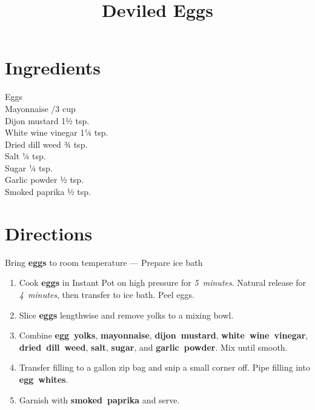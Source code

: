 \documentclass[11pt,letterpaper]{article}
\title{Deviled Eggs}
\author{}
\date{}
\begin{document}
\maketitle
\thispagestyle{empty}

\section*{Ingredients}
\setlength{\columnsep}{20pt}
\begin{multicols}{2}
\noindent
    Eggs  \\
    Mayonnaise /3 cup \\
    Dijon mustard \dotfill 1½ tsp. \\
    White wine vinegar \dotfill 1¼ tsp. \\
    \columnbreak
    Dried dill weed \dotfill ¾ tsp. \\
    Salt \dotfill ¼ tsp. \\
    Sugar \dotfill ¼ tsp. \\
    Garlic powder \dotfill ½ tsp. \\
    Smoked paprika \dotfill ½ tsp. \\
\end{multicols}

\section*{Directions}

\noindent
Bring \textbf{eggs} to room temperature ---
Prepare ice bath

\begin{enumerate}
    \item Cook \textbf{eggs} in Instant Pot on high pressure for \textit{5~minutes}. Natural release for \textit{4~minutes}, then transfer to ice bath. Peel eggs.
    
    \item Slice \textbf{eggs} lengthwise and remove yolks to a mixing bowl.
    
    \item Combine \textbf{egg~yolks}, \textbf{mayonnaise}, \textbf{dijon~mustard}, \textbf{white~wine~vinegar}, \textbf{dried~dill~weed}, \textbf{salt}, \textbf{sugar}, and \textbf{garlic~powder}. Mix until smooth.
    
    \item Transfer filling to a gallon zip bag and snip a small corner off. Pipe filling into \textbf{egg~whites}.
    
    \item Garnish with \textbf{smoked~paprika} and serve.
\end{enumerate}
\end{document}
